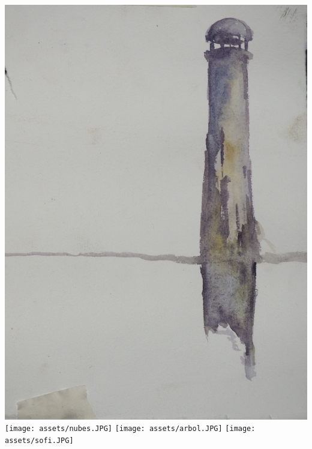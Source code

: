 \documentclass[twoside]{article}
\newcommand\myemptypage{
    \null{}
    \thispagestyle{empty}
    \addtocounter{page}{-1}
    \newpage
    }
\begin{document}
\begin{center}
    \includegraphics[width=\textwidth,height=\textheight,keepaspectratio]{assets/faro.JPG}
    \newpage
    \texttt{[image: assets/nubes.JPG]}
    \newpage
    \texttt{[image: assets/arbol.JPG]}
    \newpage
    \texttt{[image: assets/sofi.JPG]}
    \newpage
  \end{center}
  \myemptypage{}
    
\newpage
\printendnotes{}
\newpage
\nocite{*}
\printbibliography{}
\end{document}
